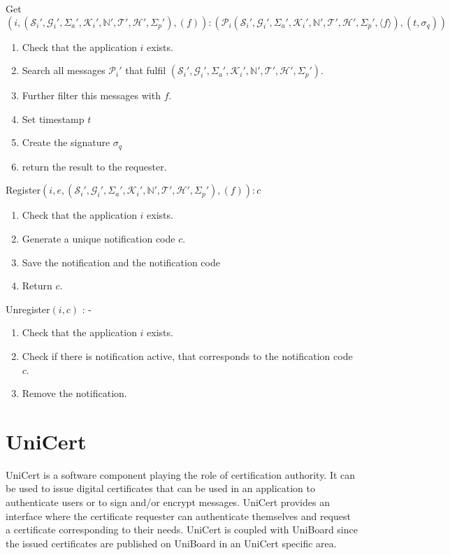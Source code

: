\documentclass[bibtotoc,halfparskip,oneside]{scrreprt}
\begin{document}
Get$(i,(\mathcal{S}_i',\mathcal{G}_i',\Sigma_a',\mathcal{K}_i',\mathbb{N}',\mathcal{T}',\mathcal{H}',\Sigma_p'),(f)): (\mathcal{P}_i(\mathcal{S}_i',\mathcal{G}_i',\Sigma_a',\mathcal{K}_i',\mathbb{N}',\mathcal{T}',\mathcal{H}',\Sigma_p',\langle f\rangle), (t, \sigma_q))$
\begin{enumerate}
	\item Check that the application $i$ exists.
	\item Search all messages $\mathcal{P}_i'$ that fulfil $(\mathcal{S}_i',\mathcal{G}_i',\Sigma_a',\mathcal{K}_i',\mathbb{N}',\mathcal{T}',\mathcal{H}',\Sigma_p')$.
	\item Further filter this messages with $f$.
	\item Set timestamp $t$
	\item Create the signature $\sigma_q$
	\item return the result to the requester.
\end{enumerate}
Register$(i, e, (\mathcal{S}_i',\mathcal{G}_i',\Sigma_a',\mathcal{K}_i',\mathbb{N}',\mathcal{T}',\mathcal{H}',\Sigma_p'),(f) ): c$
\begin{enumerate}
	\item Check that the application $i$ exists.
	\item Generate a unique notification code $c$.
	\item Save the notification and the notification code
	\item Return $c$.
\end{enumerate}
Unregister$(i, c)$ : -
\begin{enumerate}
	\item Check that the application $i$ exists.
	\item Check if there is notification active, that corresponds to the notification code $c$.
	\item Remove the notification.
\end{enumerate}


\chapter{UniCert}

UniCert is a software component playing the role of certification authority. It can be used to issue digital certificates that can be used in an application to authenticate users or to sign and/or encrypt messages. UniCert provides an interface where the certificate requester can authenticate themselves and request a certificate corresponding to their needs. UniCert is coupled with UniBoard since the issued certificates are published on UniBoard in an UniCert specific area. 
\end{document}
